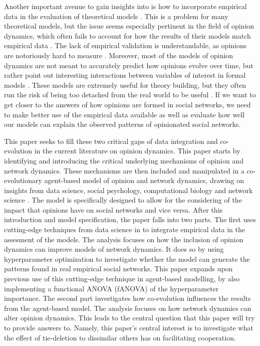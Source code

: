 \documentclass{article}
\begin{document}
Another important avenue to gain insights into is how to incorporate empirical data in the evaluation of theoretical models \cite{mas2019challenges}. This is a problem for many theoretical models, but the issue seems especially pertinent in the field of opinion dynamics, which often fails to account for how the results of their models match empirical data \cite{galesic_integrating_2021,flache_models_2017, mas2019challenges}. 
The lack of empirical validation is understandable, as opinions are notoriously hard to measure \cite{mas2019challenges}. Moreover, most of the models of opinion dynamics are not meant to accurately predict how opinions evolve over time, but rather point out interesting interactions between variables of interest in formal models \cite{mas2019challenges}. These models are extremely useful for theory building, but they often run the risk of being too detached from the real world to be useful \cite{smaldino_how_2020, mas2019challenges}. If we want to get closer to the answers of how opinions are formed in social networks, we need to make better use of the empirical data available as well as evaluate how well our models can explain the observed patterns of opinionated social networks. 

\noindent This paper seeks to fill these two critical gaps of data integration and co-evolution in the current literature on opinion dynamics. This paper starts by identifying and introducing the critical underlying mechanisms of opinion and network dynamics. These mechanisms are then included and manipulated in a co-evolutionary agent-based model of opinion and network dynamics, drawing on insights from data science, social psychology, computational biology and network science \cite{asikainen_cumulative_2020,flache_models_2017,ilany_social_2016,jackson_meeting_2007,santos_cooperation_2006}. The model is specifically designed to allow for the considering of the impact that opinions have on social networks and vice versa. 
After this introduction and model specification, the paper falls into two parts. The first uses cutting-edge techniques from data science in to integrate empirical data in the assesment of the models. The analysis focuses on how the inclusion of opinion dynamics can improve models of network dynamics. It does so by using hyperparameter optimization to investigate whether the model can generate the patterns found in real empirical social networks. This paper expands upon previous use of this cutting-edge technique in agent-based modelling, by also implementing a functional ANOVA (fANOVA) of the hyperparameter importance. 
The second part investigates how co-evolution influences the results from the agent-based model. The analysis focuses on how network dynamics can alter opinion dynamics. This leads to the central question that this paper will try to provide answers to. Namely, this paper’s central interest is to investigate what the effect of tie-deletion to dissimilar others has on facilitating cooperation. 
\end{document}
